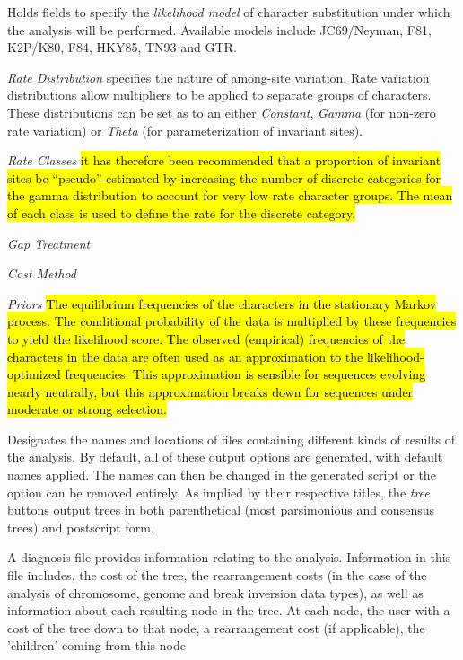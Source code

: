 \begin{description}
\setlength{\parindent}{0.5cm}
	\item[Likelihood Model Parameters]
     		   Holds fields to specify the \emph{likelihood model} of character substitution under which 
		   the analysis will be performed.  Available models include JC69/Neyman, F81, K2P/K80, F84, 
		   HKY85, TN93 and GTR. 
		   
		   \indent \emph{Rate Distribution} specifies the nature of among-site variation. 
		   Rate variation distributions allow multipliers to be applied to separate groups of characters. 
		   These distributions can be set as to an either \emph{Constant}, \emph{Gamma} (for non-zero 
		   rate variation) or  \emph{Theta} (for parameterization of invariant sites).  
		   
		   \indent \emph{Rate Classes} \hl{ it has therefore been recommended that a proportion of 
		   invariant sites be ``pseudo''-estimated by increasing the number of discrete categories for 
		   the gamma distribution to account for very low rate character groups. The mean of each class 
		   is used to define the rate for the discrete category.}
		   
		   \indent \emph{Gap Treatment}
		   
		   \indent \emph{Cost Method}
		   
		   \indent \emph{Priors}   \hl{The equilibrium frequencies of the characters in the stationary Markov 
		   process. The conditional probability of the data is multiplied by these frequencies to yield the 
		   likelihood score. The observed (empirical) frequencies of the characters in the data are often 
		   used as an approximation to the likelihood-optimized frequencies. This approximation is sensible 
		   for sequences evolving nearly neutrally, but this approximation breaks down for sequences under 
		   moderate or strong selection.}
        
        \item[Output Files]
        		Designates the names and locations of files containing different kinds of results of the analysis. 
        		By default, all of these output options are generated, with default names applied.  The names can 
      		then be changed in the generated script or the option can be removed entirely.  As implied by their 
        		respective titles, the \emph{tree} buttons output trees in both parenthetical (most parsimonious and 
        		consensus trees) and postscript form. 
        
        		\indent A diagnosis file provides information relating to the analysis. Information in this file includes, 
		the cost of the tree, the rearrangement costs (in the case of the analysis of chromosome, genome and 
		break inversion data types), as well as information about each resulting node in the tree.  At each node, 
		the user with a cost of the tree down to that node, a rearrangement cost (if applicable), the 'children' 
		coming from this node       
\end{description}

